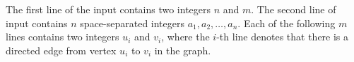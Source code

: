 The first line of the input contains two integers $n$ and $m$.
The second line of input contains $n$ space-separated integers $a_1,a_2,\ldots,a_n$.
Each of the following $m$ lines contains two integers $u_i$ and $v_i$, where the $i$-th line denotes that there is a directed edge from vertex $u_i$ to $v_i$ in the graph.